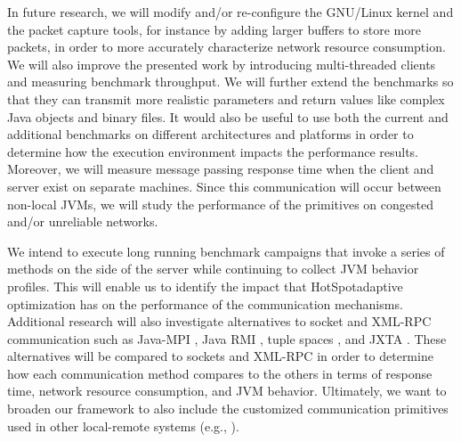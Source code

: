 \documentclass{sig-alternate}
\begin{document}

In future research, we will modify and/or re-configure the GNU/Linux
kernel and the packet capture tools, for instance by adding larger
buffers to store more packets, in order to more accurately
characterize network resource consumption.  We will also improve the
presented work by introducing multi-threaded clients and measuring
benchmark throughput.  We will further extend the benchmarks so that
they can transmit more realistic parameters and return values like
complex Java objects and binary files.  It would also be useful to use
both the current and additional benchmarks on different architectures
and platforms in order to determine how the execution environment
impacts the performance results.  Moreover, we will measure message
passing response time when the client and server exist on separate
machines.  Since this communication will occur between non-local JVMs,
we will study the performance of the primitives on congested and/or
unreliable networks.

We intend to execute long running benchmark campaigns that invoke a
series of methods on the side of the server while continuing to
collect JVM behavior profiles.  This will enable us to identify the
impact that HotSpot\texttrademark adaptive optimization has on the
performance of the communication mechanisms.  Additional research will
also investigate alternatives to socket and XML-RPC communication such
as Java-MPI \cite{getov-mpi,judd-mpi-java}, Java RMI
\cite{grosso-rmi,maasen-java-rmi}, tuple spaces
\cite{arnold-javaspace-rdb,fiedler-settle-sigmetrics-per,wells-linda-java-journal},
and JXTA \cite{oaks-jxta,seigneur-jxta}.  These alternatives will be
compared to sockets and XML-RPC in order to determine how each
communication method compares to the others in terms of response time,
network resource consumption, and JVM behavior.  Ultimately, we want
to broaden our framework to also include the customized communication
primitives used in other local-remote systems (e.g.,
\cite{tanenbaum-minix3,herder-microkernel,tang-code-complex,vaidyanathan-grid}).



\end{document}

